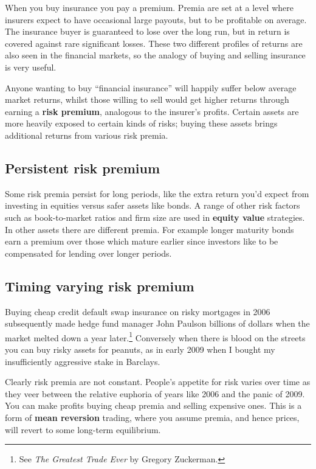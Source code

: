 When you buy insurance you pay a premium. Premia are set at a level where insurers expect to have occasional large payouts, but to be profitable on average. The insurance buyer is guaranteed to lose over the long run, but in return is covered against rare significant losses. These two different profiles of returns are also seen in the financial markets, so the analogy of buying and selling insurance is very useful.

Anyone wanting to buy ``financial insurance'' will happily suffer below average market returns, whilst those willing to sell would get higher returns through earning a \textbf{risk premium}, analogous to the insurer's profits. Certain assets are more heavily exposed to certain kinds of risks; buying these assets brings additional returns from various risk premia.

\subsection*{Persistent risk premium}

Some risk premia persist for long periods, like the extra return you'd expect from investing in equities versus safer assets like bonds. A range of other risk factors such as book-to-market ratios and firm size are used in \textbf{equity value} strategies. In other assets there are different premia. For example longer maturity bonds earn a premium over those which mature earlier since investors like to be compensated for lending over longer periods.

\subsection*{Timing varying risk premium}

Buying cheap credit default swap insurance on risky mortgages in 2006 subsequently made hedge fund manager John Paulson billions of dollars when the market melted down a year later.\footnote{See \textit{The Greatest Trade Ever} by Gregory Zuckerman.} Conversely when there is blood on the streets you can buy risky assets for peanuts, as in early 2009 when I bought my insufficiently aggressive stake in Barclays.

Clearly risk premia are not constant. People's appetite for risk varies over time as they veer between the relative euphoria of years like 2006 and the panic of 2009. You can make profits buying cheap premia and selling expensive ones. This is a form of \textbf{mean reversion} trading, where you assume premia, and hence prices, will revert to some long-term equilibrium.


